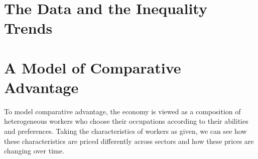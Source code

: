 \documentclass[12pt]{article}
\theoremstyle{definition}
\begin{document}
\section{The Data and the Inequality Trends}

\section{A Model of Comparative Advantage}

To model comparative advantage, the economy is viewed as a composition of heterogeneous workers who choose their occupations according to their abilities and preferences. Taking the characteristics of workers as given, we can see how these characteristics are priced differently across sectors and how these prices are changing over time. 
\end{document}
